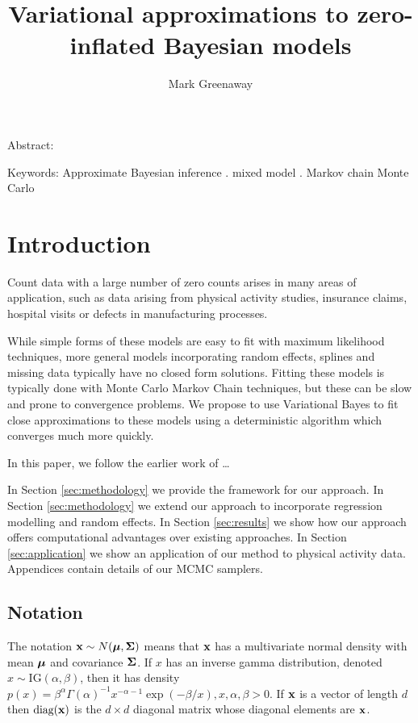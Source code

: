 \documentclass{article}[12pt]
\title{Variational approximations to zero-inflated Bayesian models}
\author{Mark Greenaway}
\begin{document}
\maketitle

Abstract:

Keywords: Approximate Bayesian inference . mixed model . Markov chain Monte Carlo

\section{Introduction}

\noindent Count data with a large number of zero counts arises in many areas of
application, such as data arising from physical activity studies, 
insurance claims, hospital visits or defects in manufacturing processes.

While simple forms of these models are easy to fit with maximum likelihood techniques,
more general models incorporating random effects, splines and missing data typically
have no closed form solutions. Fitting these models is typically done with Monte Carlo
Markov Chain techniques, but these can be slow and prone to convergence problems. We
propose to use Variational Bayes to fit close approximations to these models
using a deterministic algorithm which converges much more quickly.


In this paper, we follow the earlier work of \ldots

In Section \ref{sec:methodology} we provide the framework for our approach. In
Section \ref{sec:methodology} we extend our approach to incorporate regression modelling
and random effects. In Section \ref{sec:results} we show how our approach offers 
computational advantages over existing approaches. In Section \ref{sec:application} we 
show an application of our method to physical activity data. Appendices contain details 
of our MCMC samplers.

\subsection{Notation}

The notation ${\bf x} \sim N({\boldsymbol \mu}, {\boldsymbol \Sigma})$ means that ${\bf x}$ has a multivariate normal
density with mean ${\boldsymbol \mu}$ and covariance ${\boldsymbol \Sigma}$. If $x$ has an inverse gamma
distribution, denoted $x \sim \mbox{IG}(\alpha, \beta)$, then it has density
$p(x) = \beta^\alpha \Gamma(\alpha)^{-1}x^{-\alpha-1} \exp{(-\beta/x)}, x, \alpha,
\beta > 0$.
If ${\bf x}$ is a vector of length $d$ then $\mbox{diag}({\bf x})$ is the $d \times d$
diagonal matrix whose diagonal elements are ${\bf x}$.
\end{document}
